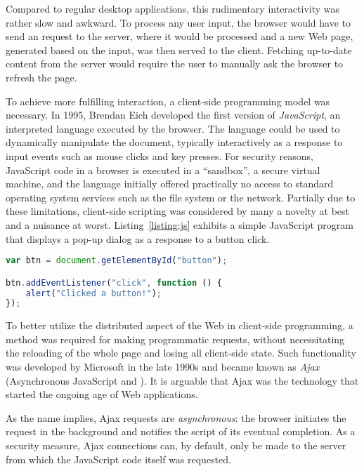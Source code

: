Compared to regular desktop applications, this rudimentary interactivity was rather slow and awkward. To process any user input, the browser would have to send an  request to the server, where it would be processed and a new Web page, generated based on the input, was then served to the client. Fetching up-to-date content from the server would require the user to manually ask the browser to refresh the page.

To achieve more fulfilling interaction, a client-side programming model was necessary. In \num{1995}, Brendan Eich developed the first version of \emph{JavaScript}, an interpreted language executed by the browser. The language could be used to dynamically manipulate the document, typically interactively as a response to input events such as mouse clicks and key presses. For security reasons, JavaScript code in a browser is executed in a ``sandbox'', a secure virtual machine, and the language initially offered practically no access to standard operating system services such as the file system or the network. Partially due to these limitations, client-side scripting was considered by many a novelty at best and a nuisance at worst. Listing~\ref{listing:js} exhibits a simple JavaScript program that displays a pop-up dialog as a response to a button click.

\begin{code}
\begin{lstlisting}[language=JavaScript,caption=A small JavaScript program.\label{listing:js}]
var btn = document.getElementById("button");

btn.addEventListener("click", function () {
    alert("Clicked a button!");
});
\end{lstlisting}
\end{code}

To better utilize the distributed aspect of the Web in client-side programming, a method was required for making programmatic  requests, without necessitating the reloading of the whole page and losing all client-side state. Such functionality was developed by Microsoft in the late \num{1990s} and became known as \emph{Ajax} (Asynchronous JavaScript and ). It is arguable that Ajax was the technology that started the ongoing age of Web applications.

As the name implies, Ajax requests are \emph{asynchronous}: the browser initiates the request in the background and notifies the script of its eventual completion. As a security measure, Ajax connections can, by default, only be made to the server from which the JavaScript code itself was requested.

